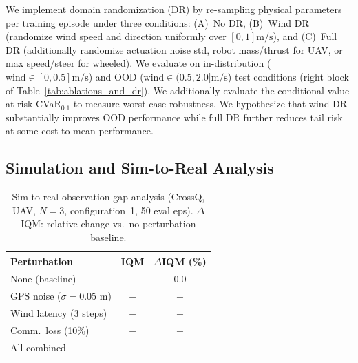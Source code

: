 \documentclass{article}
\begin{document}
We implement domain randomization (DR) \citep{tobin2017domain, peng2018sim2real} by re-sampling physical parameters per training episode under three conditions: (A)~No DR, (B)~Wind DR (randomize wind speed and direction uniformly over $[0, 1] \text{m/s}$), and (C)~Full DR (additionally randomize actuation noise std, robot mass/thrust for UAV, or max speed/steer for wheeled). We evaluate on in-distribution ($\text{wind} \in [0, 0.5] \text{m/s}$) and OOD ($\text{wind} \in (0.5, 2.0] \text{m/s}$) test conditions (right block of Table~\ref{tab:ablations_and_dr}). We additionally evaluate the conditional value-at-risk CVaR$_{0.1}$ \citep{tamar2015cvar} to measure worst-case robustness. We hypothesize that wind DR substantially improves OOD performance while full DR further reduces tail risk at some cost to mean performance.
\vspace{-4pt}

\subsection{Simulation and Sim-to-Real Analysis}
\label{sec:exp:s2r}

\begin{table}
\vspace{-1.8em}
\centering
\caption{\small Sim-to-real observation-gap analysis (CrossQ, UAV, $N = 3$, configuration~1, 50 eval eps). $\Delta$IQM: relative change vs.\ no-perturbation baseline.}
\label{tab:obs_gap}
\setlength{\tabcolsep}{4pt}
\small
\begin{tabular}{lcc}
    \toprule
    \textbf{Perturbation} & \textbf{IQM} & $\Delta$\textbf{IQM (\%)} \\
    \midrule
    None (baseline)                      & $-$ & $0.0$   \\
    GPS noise ($\sigma = 0.05$ m)     & $-$ & $-$     \\
    Wind latency (3 steps)               & $-$ & $-$     \\
    Comm.\ loss (10\%)                   & $-$ & $-$     \\
    All combined                         & $-$ & $-$     \\
    \bottomrule
\end{tabular}
\vspace{-0.8em}
\end{table}
\end{document}
